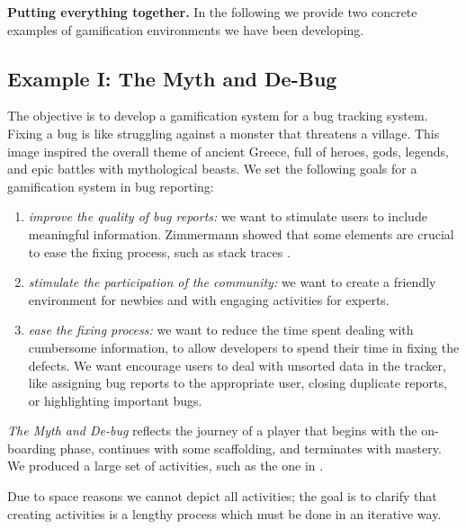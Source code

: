 {\bf Putting everything together.} In the following we provide two concrete examples of gamification environments we have been developing.

\subsection{Example I: The Myth and De-Bug}\label{sec:example-bugs}

The objective is to develop a gamification system for a bug tracking system.
Fixing a bug is like struggling against a monster that threatens a village.
This image inspired the overall theme of ancient Greece, full of heroes, gods, legends, and epic battles with mythological beasts.
We set the following goals for a gamification system in bug reporting:
\begin{enumerate}[(1)]
	\item {\em improve the quality of bug reports:} we want to stimulate users to include meaningful information.
Zimmermann \etal showed that some elements are crucial to ease the fixing process, such as stack traces \cite{Zimm2010a}.
	\item {\em stimulate the participation of the community:} we want to create a friendly environment for newbies and with engaging activities for experts.
	\item {\em ease the fixing process:} we want to reduce the time spent dealing with cumbersome information, to allow developers to spend their time in fixing the defects.
We want encourage users to deal with unsorted data in the tracker, like assigning bug reports to the appropriate user, closing duplicate reports, or highlighting important bugs.
\end{enumerate}

\textit{The Myth and De-bug} reflects the journey of a player that begins with the on-boarding phase, continues with some scaffolding, and terminates with mastery.
We produced a large set of activities, such as the one in .


Due to space reasons we cannot depict all activities; the goal is to clarify that creating activities is a lengthy process which must be done in an iterative way.

